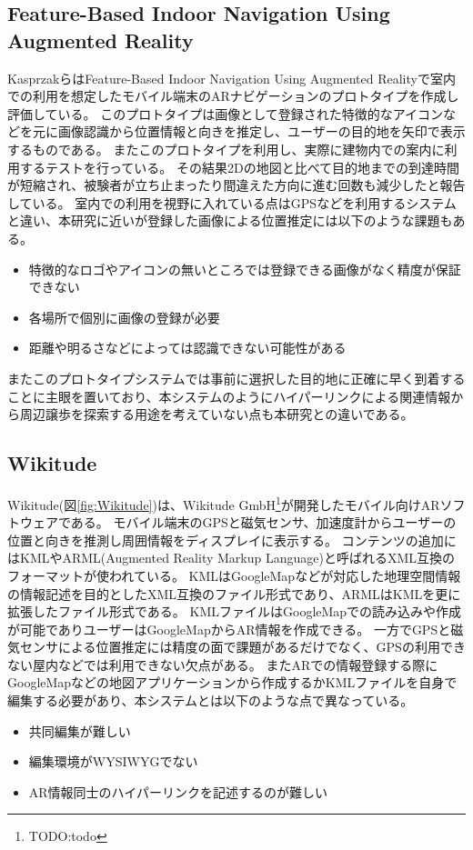 \subsection{Feature-Based Indoor Navigation Using Augmented Reality}
KasprzakらはFeature-Based Indoor Navigation Using Augmented Reality\cite{6597797}で室内での利用を想定したモバイル端末のARナビゲーションのプロトタイプを作成し評価している。
このプロトタイプは画像として登録された特徴的なアイコンなどを元に画像認識から位置情報と向きを推定し、ユーザーの目的地を矢印で表示するものである。
またこのプロトタイプを利用し、実際に建物内での案内に利用するテストを行っている。
その結果2Dの地図と比べて目的地までの到達時間が短縮され、被験者が立ち止まったり間違えた方向に進む回数も減少したと報告している。
室内での利用を視野に入れている点はGPSなどを利用するシステムと違い、本研究に近いが登録した画像による位置推定には以下のような課題もある。
\begin{itemize}
  \item 特徴的なロゴやアイコンの無いところでは登録できる画像がなく精度が保証できない
  \item 各場所で個別に画像の登録が必要
  \item 距離や明るさなどによっては認識できない可能性がある
\end{itemize}
またこのプロトタイプシステムでは事前に選択した目的地に正確に早く到着することに主眼を置いており、本システムのようにハイパーリンクによる関連情報から周辺譲歩を探索する用途を考えていない点も本研究との違いである。

\subsection{Wikitude}
Wikitude(図\ref{fig:Wikitude})は、Wikitude GmbH\footnote{\textsf{TODO:todo}}が開発したモバイル向けARソフトウェアである。
モバイル端末のGPSと磁気センサ、加速度計からユーザーの位置と向きを推測し周囲情報をディスプレイに表示する。
コンテンツの追加にはKMLやARML(Augmented Reality Markup Language)と呼ばれるXML互換のフォーマットが使われている。
KMLはGoogleMapなどが対応した地理空間情報の情報記述を目的としたXML互換のファイル形式であり、ARMLはKMLを更に拡張したファイル形式である。
KMLファイルはGoogleMapでの読み込みや作成が可能でありユーザーはGoogleMapからAR情報を作成できる。
一方でGPSと磁気センサによる位置推定には精度の面で課題があるだけでなく、GPSの利用できない屋内などでは利用できない欠点がある。
またARでの情報登録する際にGoogleMapなどの地図アプリケーションから作成するかKMLファイルを自身で編集する必要があり、本システムとは以下のような点で異なっている。
\begin{itemize}
  \item 共同編集が難しい
  \item 編集環境がWYSIWYGでない
  \item AR情報同士のハイパーリンクを記述するのが難しい
\end{itemize}


